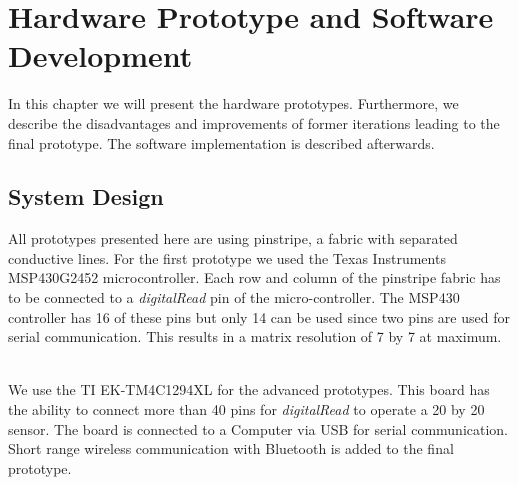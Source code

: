 %
\chapter{Hardware Prototype and Software Development}
\label{Hardware Prototype and Software Development} 
In this chapter we will present the hardware prototypes. Furthermore, we describe the disadvantages and improvements of former iterations leading to the final prototype. The software implementation is described afterwards.

\section{System Design}
All prototypes presented here are using pinstripe, a fabric with separated conductive lines. For the first prototype we used the Texas Instruments MSP430G2452 microcontroller. Each row and column of the pinstripe fabric has to be connected to a \emph{digitalRead} pin of the micro-controller. The MSP430 controller has 16 of these pins but only 14 can be used since two pins are used for serial communication. This results in a matrix resolution of 7 by 7 at maximum. 
\\ \\

We use the TI EK-TM4C1294XL for the advanced prototypes. This board has the ability to connect more than 40 pins for \emph{digitalRead} to operate a 20 by 20 sensor. The board is connected to a Computer via USB for serial communication. Short range wireless communication with Bluetooth is added to the final prototype.\\

